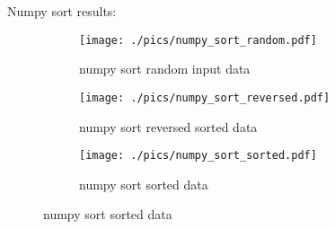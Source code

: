 Numpy sort results:

\begin{figure}[H]
	\centering
	\begin{subfigure}[b]{0.5\textwidth}
		\centering
		\texttt{[image: ./pics/numpy\_sort\_random.pdf]}
		\caption{numpy sort random input data}
	\end{subfigure}
	\hfill
	\begin{subfigure}[b]{0.5\textwidth}
		\centering
		\texttt{[image: ./pics/numpy\_sort\_reversed.pdf]}
		\caption{numpy sort reversed sorted data}
	\end{subfigure}
	\hfill
	\begin{subfigure}[b]{0.5\textwidth}
		\centering
		\texttt{[image: ./pics/numpy\_sort\_sorted.pdf]}
		\caption{numpy sort sorted data}
	\end{subfigure}
\end{figure}
